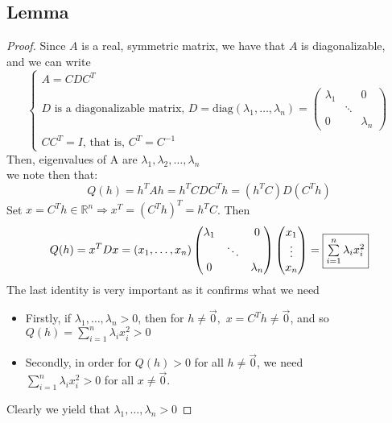 \documentclass[12pt]{article}
\newcommand{\BR}{\mathbb R}
\begin{document}
\subsection{Lemma}
\begin{proof}
  Since $A$ is a real, symmetric matrix, we have that $A$ is diagonalizable, \\
  and we can write \\
  \begin{equation*}
    \begin{cases}
      A = CDC^T \\
      D \text{ is a diagonalizable matrix, }D=\text{diag}(\lambda_1,\dots,\lambda_n)=\begin{pmatrix*}\lambda_1 & & 0 \\ & \ddots & \\ 0 & & \lambda_n \end{pmatrix*}\\
      CC^T = I\text{, that is, }C^T=C^{-1}
    \end{cases}
  \end{equation*}
Then, eigenvalues of A are $\lambda_1,\lambda_2,\dots,\lambda_n$ \\
we note then that:
\[ Q(h) = h^TAh = h^TCDC^Th=(h^TC)D(C^Th) \]
Set $x=C^Th\in\BR^n\Rightarrow x^T=(C^Th)^T=h^TC$. Then \\
\[ Q(h) = x^TDx=(x_1,\dots,x_n)\begin{pmatrix*}
  \lambda_1 & & 0 \\
  & \ddots & \\
  0 & & \lambda_n
\end{pmatrix*}
\begin{pmatrix*}
  x_1 \\
  \vdots \\
  x_n
\end{pmatrix*}
=\fbox{$\sum\limits_{i=1}^{n}\lambda_ix_i^2$}\]
The last identity is very important as it confirms what we need \\
\begin{itemize}
  \item Firstly, if $\lambda_1,\dots,\lambda_n>0$, then for $h\neq\vec{0},$ $x=C^Th\neq\vec{0}$, and so\\$Q(h)=\sum\limits_{i=1}^{n}\lambda_ix_i^2>0$
  \item Secondly, in order for $Q(h)>0$ for all $h\neq\vec{0}$, we need\\$\sum\limits_{i=1}^{n}\lambda_ix_i^2>0$ for all $x\neq\vec{0}$.
\end{itemize}
Clearly we yield that $\lambda_1,\dots,\lambda_n>0$
\end{proof}
\end{document}
